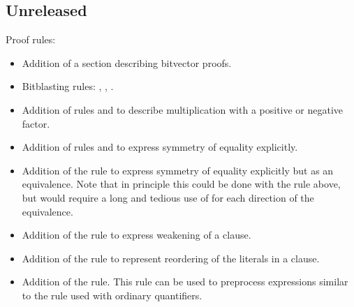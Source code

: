\subsection*{Unreleased}

Proof rules:
\begin{itemize}
  \item Addition of a section describing bitvector proofs.
  \item Bitblasting rules: ,  ,
      .
  \item Addition of rules  and  to describe multiplication with a positive or negative factor.
  \item Addition of rules  and  to express symmetry of equality explicitly.
  \item Addition of the rule  to express symmetry
  of equality explicitly but as an equivalence. Note that in principle this
  could be done with the rule  above, but would require a long
  and tedious use of  for each direction of the equivalence.
  \item Addition of the rule  to express weakening of a
        clause.
  \item Addition of the  rule to represent reordering of
        the literals in a clause.
  \item Addition of the  rule.  This rule can be used to
        preprocess  expressions similar to the 
        rule used with ordinary quantifiers.
\end{itemize}

